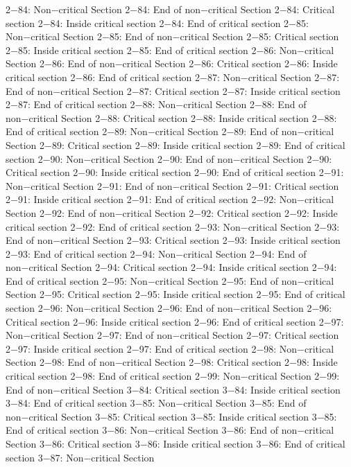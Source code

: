 2−84: Non−critical Section
2−84: End of non−critical Section
2−84: Critical section
2−84: Inside critical section
2−84: End of critical section
2−85: Non−critical Section
2−85: End of non−critical Section
2−85: Critical section
2−85: Inside critical section
2−85: End of critical section
2−86: Non−critical Section
2−86: End of non−critical Section
2−86: Critical section
2−86: Inside critical section
2−86: End of critical section
2−87: Non−critical Section
2−87: End of non−critical Section
2−87: Critical section
2−87: Inside critical section
2−87: End of critical section
2−88: Non−critical Section
2−88: End of non−critical Section
2−88: Critical section
2−88: Inside critical section
2−88: End of critical section
2−89: Non−critical Section
2−89: End of non−critical Section
2−89: Critical section
2−89: Inside critical section
2−89: End of critical section
2−90: Non−critical Section
2−90: End of non−critical Section
2−90: Critical section
2−90: Inside critical section
2−90: End of critical section
2−91: Non−critical Section
2−91: End of non−critical Section
2−91: Critical section
2−91: Inside critical section
2−91: End of critical section
2−92: Non−critical Section
2−92: End of non−critical Section
2−92: Critical section
2−92: Inside critical section
2−92: End of critical section
2−93: Non−critical Section
2−93: End of non−critical Section
2−93: Critical section
2−93: Inside critical section
2−93: End of critical section
2−94: Non−critical Section
2−94: End of non−critical Section
2−94: Critical section
2−94: Inside critical section
2−94: End of critical section
2−95: Non−critical Section
2−95: End of non−critical Section
2−95: Critical section
2−95: Inside critical section
2−95: End of critical section
2−96: Non−critical Section
2−96: End of non−critical Section
2−96: Critical section
2−96: Inside critical section
2−96: End of critical section
2−97: Non−critical Section
2−97: End of non−critical Section
2−97: Critical section
2−97: Inside critical section
2−97: End of critical section
2−98: Non−critical Section
2−98: End of non−critical Section
2−98: Critical section
2−98: Inside critical section
2−98: End of critical section
2−99: Non−critical Section
2−99: End of non−critical Section
3−84: Critical section
3−84: Inside critical section
3−84: End of critical section
3−85: Non−critical Section
3−85: End of non−critical Section
3−85: Critical section
3−85: Inside critical section
3−85: End of critical section
3−86: Non−critical Section
3−86: End of non−critical Section
3−86: Critical section
3−86: Inside critical section
3−86: End of critical section
3−87: Non−critical Section

